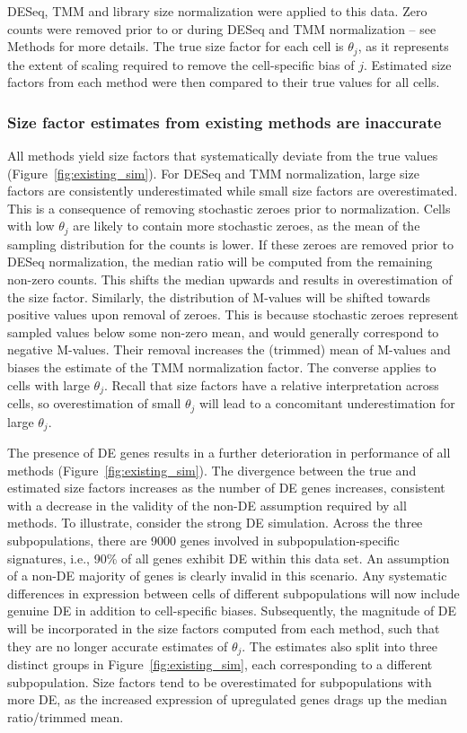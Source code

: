 \documentclass{bmcart}
\begin{document}
DESeq, TMM and library size normalization were applied to this data.
Zero counts were removed prior to or during DESeq and TMM normalization -- see Methods for more details.
The true size factor for each cell is $\theta_j$, as it represents the extent of scaling required to remove the cell-specific bias of $j$.
Estimated size factors from each method were then compared to their true values for all cells.

\subsubsection*{Size factor estimates from existing methods are inaccurate}
All methods yield size factors that systematically deviate from the true values (Figure~\ref{fig:existing_sim}).
For DESeq and TMM normalization, large size factors are consistently underestimated while small size factors are overestimated.
This is a consequence of removing stochastic zeroes prior to normalization.
Cells with low $\theta_j$ are likely to contain more stochastic zeroes, as the mean of the sampling distribution for the counts is lower.
If these zeroes are removed prior to DESeq normalization, the median ratio will be computed from the remaining non-zero counts.
This shifts the median upwards and results in overestimation of the size factor.
Similarly, the distribution of M-values will be shifted towards positive values upon removal of zeroes.
This is because stochastic zeroes represent sampled values below some non-zero mean, and would generally correspond to negative M-values.
Their removal increases the (trimmed) mean of M-values and biases the estimate of the TMM normalization factor.
The converse applies to cells with large $\theta_j$.
Recall that size factors have a relative interpretation across cells, so overestimation of small $\theta_j$ will lead to a concomitant underestimation for large $\theta_j$.

The presence of DE genes results in a further deterioration in performance of all methods (Figure~\ref{fig:existing_sim}).
The divergence between the true and estimated size factors increases as the number of DE genes increases,
    consistent with a decrease in the validity of the non-DE assumption required by all methods.
To illustrate, consider the strong DE simulation.
Across the three subpopulations, there are 9000 genes involved in subpopulation-specific signatures, i.e., 90\% of all genes exhibit DE within this data set.
An assumption of a non-DE majority of genes is clearly invalid in this scenario.
Any systematic differences in expression between cells of different subpopulations will now include genuine DE in addition to cell-specific biases.
Subsequently, the magnitude of DE will be incorporated in the size factors computed from each method, such that they are no longer accurate estimates of $\theta_j$.
The estimates also split into three distinct groups in Figure~\ref{fig:existing_sim}, each corresponding to a different subpopulation.
Size factors tend to be overestimated for subpopulations with more DE, as the increased expression of upregulated genes drags up the median ratio/trimmed mean.
\end{document}
